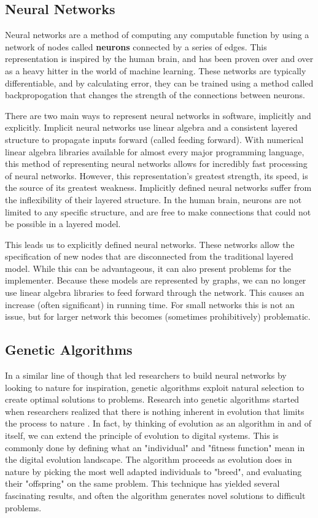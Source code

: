 \documentclass{article}
\begin{document}
\begin{multicols}{2}
\subsection{Neural Networks}
Neural networks are a method of computing any computable function by using a
network of nodes called \textbf{neurons} connected by a series of edges. This
representation is inspired by the human brain, and has been proven over and over
as a heavy hitter in the world of machine learning. These networks are typically
differentiable, and by calculating error, they can be trained using a method
called backpropogation that changes the strength of the connections between
neurons.

There are two main ways to represent neural networks in software, implicitly and
explicitly. Implicit neural networks use linear algebra and a consistent layered
structure to propagate inputs forward (called feeding forward). With numerical
linear algebra libraries available for almost every major programming language,
this method of representing neural networks allows for incredibly fast
processing
of neural networks. However, this representation's greatest strength, its speed,
is the source of its greatest weakness. Implicitly defined neural networks
suffer
from the inflexibility of their layered structure. In the human brain, neurons
are not limited to any specific structure, and are free to make connections
that could not be possible in a layered model.

This leads us to explicitly defined neural networks. These networks allow the
specification of new nodes that are disconnected from the traditional layered
model. While this can be advantageous, it can also present problems for the
implementer. Because these models are represented by graphs, we can no longer
use linear algebra libraries to feed forward through the network. This causes
an increase (often significant) in running time. For small networks this is
not an issue, but for larger network this becomes (sometimes prohibitively)
problematic.

\subsection{Genetic Algorithms}
In a similar line of though that led researchers to build neural networks by
looking to nature for inspiration, genetic algorithms exploit natural selection
to create optimal solutions to problems. Research into genetic algorithms
started when researchers realized that there is nothing inherent in evolution
that limits the process to nature . In fact, by thinking of evolution as
an algorithm in and of itself, we can extend the principle of evolution to
digital systems. This is commonly done by defining what an "individual" and
"fitness function" mean in the digital evolution landscape. The algorithm
proceeds as evolution does in nature by picking the most well adapted
individuals to "breed", and evaluating their "offspring" on the same problem.
This technique has yielded several fascinating results, and often the
algorithm generates novel solutions to difficult problems.


\end{multicols}
\end{document}
